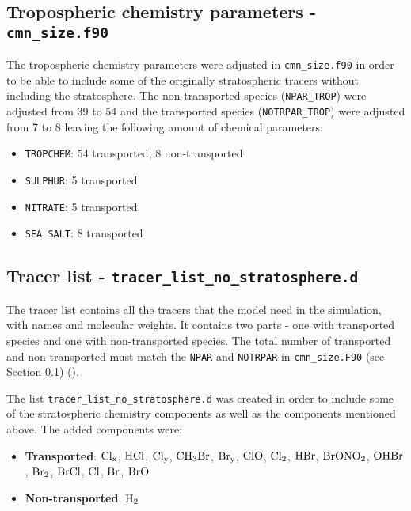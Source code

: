 \subsection{Tropospheric chemistry parameters - \texttt{cmn\_size.f90}}\label{subsubsec:cmn_size}


The tropospheric chemistry parameters were adjusted in \texttt{cmn\_size.f90} in order to be able to include some of the originally stratospheric tracers without including the stratosphere. The non-transported species (\texttt{NPAR\_TROP}) were adjusted from 39 to 54 and the transported species (\texttt{NOTRPAR\_TROP}) were adjusted from 7 to 8 leaving the following amount of chemical parameters:

\begin{itemize}
    \item \texttt{TROPCHEM}: 54 transported, 8 non-transported
    \item \texttt{SULPHUR}: 5 transported
    \item \texttt{NITRATE}: 5 transported
    \item \texttt{SEA SALT}: 8 transported
\end{itemize}



\subsection{Tracer list - \texttt{tracer\_list\_no\_stratosphere.d}}\label{subsubsec:tracer_list}

The tracer list contains all the tracers that the model need in the simulation, with names and molecular weights. It contains two parts - one with transported species and one with non-transported species. The total number of transported and non-transported must match the \texttt{NPAR} and \texttt{NOTRPAR} in \texttt{cmn\_size.F90} (see Section \ref{subsubsec:cmn_size}) (\cite{SovdeManual}). 

\medskip

The list \texttt{tracer\_list\_no\_stratosphere.d} was created in order to include some of the stratospheric chemistry components as well as the components mentioned above. The added components were: 

\begin{itemize}
    \item \textbf{Transported}: $\mathrm{Cl_x}$, $\mathrm{HCl}$, $\mathrm{Cl_y}$, $\mathrm{CH_3Br}$, $\mathrm{Br_y}$, $\mathrm{ClO}$, $\mathrm{Cl_2}$, $\mathrm{HBr}$, $\mathrm{BrONO_2}$, $\mathrm{OHBr}$, $\mathrm{Br_2}$, $\mathrm{BrCl}$, $\mathrm{Cl}$, $\mathrm{Br}$, $\mathrm{BrO}$
    \item \textbf{Non-transported}: $\mathrm{H_2}$
\end{itemize}

